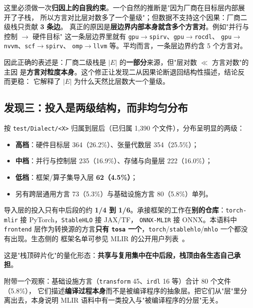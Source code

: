 这里必须做一次\textbf{归因上的自我约束}。一个自然的推断是"因为厂商在目标层内部展开了子栈，
所以方言对比层对数多了一个量级"；但数据不支持这个因果：厂商二级栈只贡献 \textbf{3 条边}。
真正的原因是\textbf{层边界内部本身就含多个方言对}。例如"并行与控制 $\rightarrow$ 硬件目标"
这一条层边界里就有 \texttt{gpu}$\rightarrow$\texttt{spirv}、\texttt{gpu}$\rightarrow$\texttt{rocdl}、
\texttt{gpu}$\rightarrow$\texttt{nvvm}、\texttt{scf}$\rightarrow$\texttt{spirv}、
\texttt{omp}$\rightarrow$\texttt{llvm} 等。平均而言，一条层边界约含 5 个方言对。

因此正确的表述是：厂商二级栈是 $|E|$ 的\textbf{一部分}来源，但"层对数 $\ll$ 方言对数"的主因
是\textbf{方言对粒度本身}。这个修正让发现二从因果论断退回结构性描述，结论反而更稳：
它解释了 $|E|$ 为什么天然比层数大一个量级。

\subsection{发现三：投入是两级结构，而非均匀分布}

按 \texttt{test/Dialect/<X>} 归属到层后（已归属 1,390 个文件），分布呈明显的两级：

\begin{itemize}
  \item \textbf{高档}：硬件目标层 364（26.2\%）、张量代数层 354（25.5\%）；
  \item \textbf{中档}：并行与控制层 235（16.9\%）、存储与向量层 222（16.0\%）；
  \item \textbf{低档}：框架/算子集导入层 \textbf{62（4.5\%）}；
  \item 另有跨层通用方言 73（5.3\%）与基础设施方言 80（5.8\%）单列。
\end{itemize}

导入层的投入只有中后段的约 \textbf{1/4 到 1/6}。承接框架的工作在\textbf{别的仓库}：\texttt{torch-mlir} 接 PyTorch，\texttt{StableHLO} 接 JAX/TF，
\texttt{ONNX-MLIR} 接 ONNX。本语料中 \texttt{frontend} 层作为转换源的方言\textbf{只有
\texttt{tosa} 一个}，\texttt{torch}/\texttt{stablehlo}/\texttt{mhlo} 一个都没有出现。生态侧的
框架名单可参见 MLIR 的公开用户列表~\cite{mlirusers}。

这是"栈顶碎片化"的量化形态：\textbf{共享与复用集中在中后段，栈顶由各生态自己承担}。

附带一个观察：基础设施方言（\texttt{transform} 45、\texttt{irdl} 16 等）合计 80 个文件（5.8\%），
它们描述\textbf{编译过程本身}而不是被编译程序的抽象层。把它们从"层"里分离出去，本身说明
MLIR 语料中有一类投入与"被编译程序的分层"无关。

